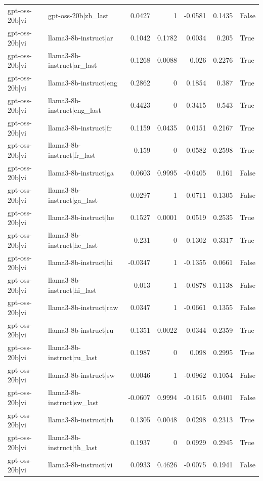 \begin{table}
\begin{tabular}{l l r r r r l}
gpt-oss-20b|vi & gpt-oss-20b|zh_last & 0.0427 & 1 & -0.0581 & 0.1435 & False \\
gpt-oss-20b|vi & llama3-8b-instruct|ar & 0.1042 & 0.1782 & 0.0034 & 0.205 & True \\
gpt-oss-20b|vi & llama3-8b-instruct|ar_last & 0.1268 & 0.0088 & 0.026 & 0.2276 & True \\
gpt-oss-20b|vi & llama3-8b-instruct|eng & 0.2862 & 0 & 0.1854 & 0.387 & True \\
gpt-oss-20b|vi & llama3-8b-instruct|eng_last & 0.4423 & 0 & 0.3415 & 0.543 & True \\
gpt-oss-20b|vi & llama3-8b-instruct|fr & 0.1159 & 0.0435 & 0.0151 & 0.2167 & True \\
gpt-oss-20b|vi & llama3-8b-instruct|fr_last & 0.159 & 0 & 0.0582 & 0.2598 & True \\
gpt-oss-20b|vi & llama3-8b-instruct|ga & 0.0603 & 0.9995 & -0.0405 & 0.161 & False \\
gpt-oss-20b|vi & llama3-8b-instruct|ga_last & 0.0297 & 1 & -0.0711 & 0.1305 & False \\
gpt-oss-20b|vi & llama3-8b-instruct|he & 0.1527 & 0.0001 & 0.0519 & 0.2535 & True \\
gpt-oss-20b|vi & llama3-8b-instruct|he_last & 0.231 & 0 & 0.1302 & 0.3317 & True \\
gpt-oss-20b|vi & llama3-8b-instruct|hi & -0.0347 & 1 & -0.1355 & 0.0661 & False \\
gpt-oss-20b|vi & llama3-8b-instruct|hi_last & 0.013 & 1 & -0.0878 & 0.1138 & False \\
gpt-oss-20b|vi & llama3-8b-instruct|raw & 0.0347 & 1 & -0.0661 & 0.1355 & False \\
gpt-oss-20b|vi & llama3-8b-instruct|ru & 0.1351 & 0.0022 & 0.0344 & 0.2359 & True \\
gpt-oss-20b|vi & llama3-8b-instruct|ru_last & 0.1987 & 0 & 0.098 & 0.2995 & True \\
gpt-oss-20b|vi & llama3-8b-instruct|sw & 0.0046 & 1 & -0.0962 & 0.1054 & False \\
gpt-oss-20b|vi & llama3-8b-instruct|sw_last & -0.0607 & 0.9994 & -0.1615 & 0.0401 & False \\
gpt-oss-20b|vi & llama3-8b-instruct|th & 0.1305 & 0.0048 & 0.0298 & 0.2313 & True \\
gpt-oss-20b|vi & llama3-8b-instruct|th_last & 0.1937 & 0 & 0.0929 & 0.2945 & True \\
gpt-oss-20b|vi & llama3-8b-instruct|vi & 0.0933 & 0.4626 & -0.0075 & 0.1941 & False \\

\end{tabular}
\end{table}
